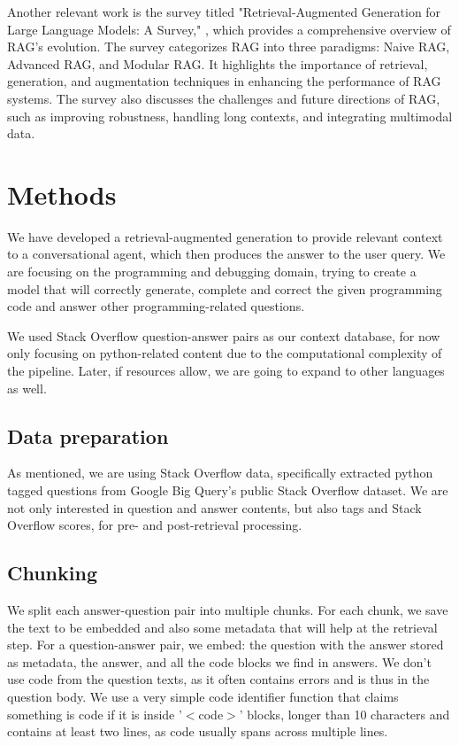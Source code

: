 \documentclass[fleqn,moreauthors,10pt]{ds_report}
\begin{document}
Another relevant work is the survey titled "Retrieval-Augmented Generation for Large Language Models: A Survey," \cite{gao2024retrievalaugmentedgenerationlargelanguage}, which provides a comprehensive overview of RAG's evolution. The survey categorizes RAG into three paradigms: Naive RAG, Advanced RAG, and Modular RAG. It highlights the importance of retrieval, generation, and augmentation techniques in enhancing the performance of RAG systems. The survey also discusses the challenges and future directions of RAG, such as improving robustness, handling long contexts, and integrating multimodal data.
	


\section*{Methods}
We have developed a retrieval-augmented generation to provide relevant context to a conversational agent, which then produces the answer to the user query. We are focusing on the programming and debugging domain, trying to create a model that will correctly generate, complete and correct the given programming code and answer other programming-related questions. 

We used Stack Overflow \cite{StackOverflow} question-answer pairs as our context database, for now only  focusing on python-related content due to the computational complexity of the pipeline. Later, if resources allow, we are going to expand to other languages as well.

\subsection*{Data preparation}
As mentioned, we are using Stack Overflow data, specifically extracted python tagged questions from Google Big Query's public Stack Overflow dataset. We are not only  interested in question and answer contents, but also tags and Stack Overflow scores, for pre- and post-retrieval processing.

\subsection*{Chunking}
We split each answer-question pair into multiple chunks. For each chunk, we save the text to be embedded and also some metadata that will help at the retrieval step. For a question-answer pair, we embed: the question with the answer stored as metadata, the answer, and all the code blocks we find in answers. We don't use code from the question texts, as it often contains errors and is thus in the question body. We use a very simple code identifier function that claims something is code if it is inside '$<$code$>$' blocks, longer than 10 characters and contains at least two lines, as code usually spans across multiple lines. 
\end{document}
